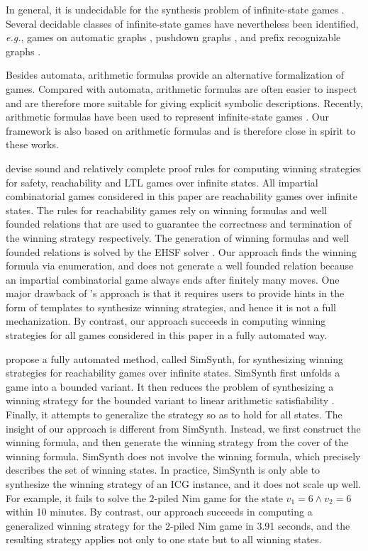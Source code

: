 \documentclass[review]{elsarticle}
\newcommand\eg{{\it e.g.}}
\begin{document}
In general, it is undecidable for the synthesis problem of infinite-state games \cite{AlfHM2001}.
Several decidable classes of infinite-state games have nevertheless been identified, \eg, games on automatic graphs \cite{NeiT2016}, pushdown graphs \cite{Cac2002,ChaF2013}, and prefix recognizable graphs \cite{Cac2003}.

Besides automata, arithmetic formulas provide an alternative formalization of games.
Compared with automata, arithmetic formulas are often easier to inspect and are therefore more suitable for giving explicit symbolic descriptions.
Recently, arithmetic formulas have been used to represent infinite-state games \cite{BeyCPR2014,FarK2018,BaiCF2021,FaeP2023}.
Our framework is also based on arithmetic formulas and is therefore close in spirit to these works. 

\citet{BeyCPR2014} devise sound and relatively complete proof rules for computing winning strategies for safety, reachability and LTL games over infinite states.
All impartial combinatorial games considered in this paper are reachability games over infinite states.
The rules for reachability games rely on winning formulas and well founded relations that are used to guarantee the correctness and termination of the winning strategy respectively.
The generation of winning formulas and well founded relations is solved by the EHSF solver \cite{BeyPR2013}.
Our approach finds the winning formula via enumeration, and does not generate a well founded relation because an impartial combinatorial game always ends after finitely many moves.
One major drawback of \citeauthor{BeyCPR2014}'s approach is that it requires users to provide hints in the form of templates to synthesize winning strategies, and hence it is not a full mechanization.
By contrast, our approach succeeds in computing winning strategies for all games considered in this paper in a fully automated way.

\citet{FarK2018} propose a fully automated method, called SimSynth, for synthesizing winning strategies for reachability games over infinite states.
SimSynth first unfolds a game into a bounded variant.
It then reduces the problem of synthesizing a winning strategy for the bounded variant to linear arithmetic satisfiability \cite{FarK2016}.
Finally, it attempts to generalize the strategy so as to hold for all states.
The insight of our approach is different from SimSynth.
Instead, we first construct the winning formula, and then generate the winning strategy from the cover of the winning formula.
SimSynth does not involve the winning formula, which precisely describes the set of winning states.
In practice, SimSynth is only able to synthesize the winning strategy of an ICG instance, and it does not scale up well.
For example, it fails to solve the $2$-piled Nim game for the state $v_1 = 6 \land v_2 = 6$ within 10 minutes.
By contrast, our approach succeeds in computing a generalized winning strategy for the $2$-piled Nim game in 3.91 seconds, and the resulting strategy applies not only to one state but to all winning states.
\end{document}
